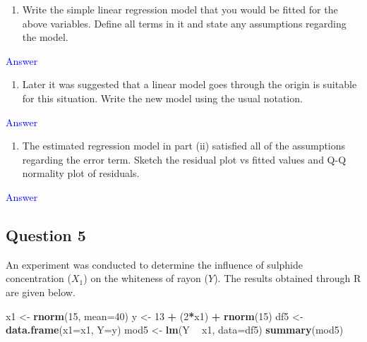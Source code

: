 \documentclass[]{article}
\newenvironment{Shaded}{\begin{snugshade}}{\end{snugshade}}
\newcommand{\DataTypeTok}[1]{\textcolor[rgb]{0.13,0.29,0.53}{#1}}
\newcommand{\DecValTok}[1]{\textcolor[rgb]{0.00,0.00,0.81}{#1}}
\newcommand{\KeywordTok}[1]{\textcolor[rgb]{0.13,0.29,0.53}{\textbf{#1}}}
\newcommand{\NormalTok}[1]{#1}
\newcommand{\OperatorTok}[1]{\textcolor[rgb]{0.81,0.36,0.00}{\textbf{#1}}}
\newcommand{\StringTok}[1]{\textcolor[rgb]{0.31,0.60,0.02}{#1}}
\providecommand{\tightlist}{%
  \setlength{\itemsep}{0pt}\setlength{\parskip}{0pt}}
\begin{document}
\begin{enumerate}
\def\labelenumi{\roman{enumi})}
\tightlist
\item
  Write the simple linear regression model that you would be fitted for
  the above variables. Define all terms in it and state any assumptions
  regarding the model.
\end{enumerate}

\textcolor{blue}{Answer}

\newpage

\begin{enumerate}
\def\labelenumi{\roman{enumi})}
\setcounter{enumi}{1}
\tightlist
\item
  Later it was suggested that a linear model goes through the origin is
  suitable for this situation. Write the new model using the usual
  notation.
\end{enumerate}

\textcolor{blue}{Answer}

\newpage

\begin{enumerate}
\def\labelenumi{\roman{enumi})}
\setcounter{enumi}{2}
\tightlist
\item
  The estimated regression model in part (ii) satisfied all of the
  assumptions regarding the error term. Sketch the residual plot vs
  fitted values and Q-Q normality plot of residuals.
\end{enumerate}

\textcolor{blue}{Answer}

\newpage

\hypertarget{question-5}{%
\subsection{Question 5}\label{question-5}}

An experiment was conducted to determine the influence of sulphide
concentration (\(X_1\)) on the whiteness of rayon (\(Y\)). The results
obtained through R are given below.

\begin{Shaded}
\begin{Highlighting}[]
\NormalTok{x1 <-}\StringTok{ }\KeywordTok{rnorm}\NormalTok{(}\DecValTok{15}\NormalTok{, }\DataTypeTok{mean=}\DecValTok{40}\NormalTok{)}
\NormalTok{y <-}\StringTok{ }\DecValTok{13} \OperatorTok{+}\StringTok{ }\NormalTok{(}\DecValTok{2}\OperatorTok{*}\NormalTok{x1) }\OperatorTok{+}\StringTok{ }\KeywordTok{rnorm}\NormalTok{(}\DecValTok{15}\NormalTok{)}
\NormalTok{df5 <-}\StringTok{ }\KeywordTok{data.frame}\NormalTok{(}\DataTypeTok{x1=}\NormalTok{x1, }\DataTypeTok{Y=}\NormalTok{y)}
\NormalTok{mod5 <-}\StringTok{ }\KeywordTok{lm}\NormalTok{(Y }\OperatorTok{~}\StringTok{ }\NormalTok{x1, }\DataTypeTok{data=}\NormalTok{df5)}
\KeywordTok{summary}\NormalTok{(mod5)}
\end{Highlighting}
\end{Shaded}
\end{document}
